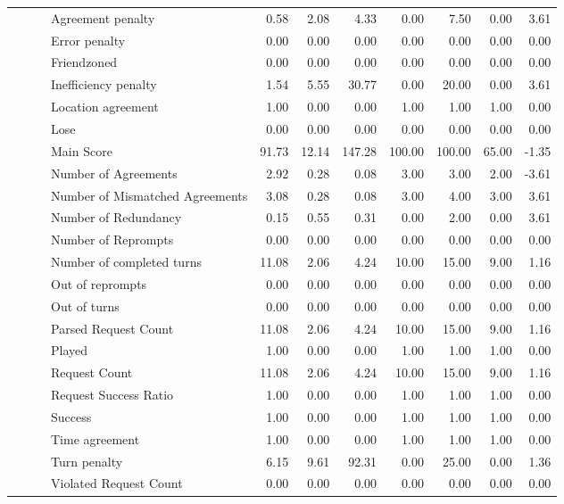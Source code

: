 \begin{tabular}{llllrrrrrrr}
 &  &  & Agreement penalty & 0.58 & 2.08 & 4.33 & 0.00 & 7.50 & 0.00 & 3.61 \\
 &  &  & Error penalty & 0.00 & 0.00 & 0.00 & 0.00 & 0.00 & 0.00 & 0.00 \\
 &  &  & Friendzoned & 0.00 & 0.00 & 0.00 & 0.00 & 0.00 & 0.00 & 0.00 \\
 &  &  & Inefficiency penalty & 1.54 & 5.55 & 30.77 & 0.00 & 20.00 & 0.00 & 3.61 \\
 &  &  & Location agreement & 1.00 & 0.00 & 0.00 & 1.00 & 1.00 & 1.00 & 0.00 \\
 &  &  & Lose & 0.00 & 0.00 & 0.00 & 0.00 & 0.00 & 0.00 & 0.00 \\
 &  &  & Main Score & 91.73 & 12.14 & 147.28 & 100.00 & 100.00 & 65.00 & -1.35 \\
 &  &  & Number of Agreements & 2.92 & 0.28 & 0.08 & 3.00 & 3.00 & 2.00 & -3.61 \\
 &  &  & Number of Mismatched Agreements & 3.08 & 0.28 & 0.08 & 3.00 & 4.00 & 3.00 & 3.61 \\
 &  &  & Number of Redundancy & 0.15 & 0.55 & 0.31 & 0.00 & 2.00 & 0.00 & 3.61 \\
 &  &  & Number of Reprompts & 0.00 & 0.00 & 0.00 & 0.00 & 0.00 & 0.00 & 0.00 \\
 &  &  & Number of completed turns & 11.08 & 2.06 & 4.24 & 10.00 & 15.00 & 9.00 & 1.16 \\
 &  &  & Out of reprompts & 0.00 & 0.00 & 0.00 & 0.00 & 0.00 & 0.00 & 0.00 \\
 &  &  & Out of turns & 0.00 & 0.00 & 0.00 & 0.00 & 0.00 & 0.00 & 0.00 \\
 &  &  & Parsed Request Count & 11.08 & 2.06 & 4.24 & 10.00 & 15.00 & 9.00 & 1.16 \\
 &  &  & Played & 1.00 & 0.00 & 0.00 & 1.00 & 1.00 & 1.00 & 0.00 \\
 &  &  & Request Count & 11.08 & 2.06 & 4.24 & 10.00 & 15.00 & 9.00 & 1.16 \\
 &  &  & Request Success Ratio & 1.00 & 0.00 & 0.00 & 1.00 & 1.00 & 1.00 & 0.00 \\
 &  &  & Success & 1.00 & 0.00 & 0.00 & 1.00 & 1.00 & 1.00 & 0.00 \\
 &  &  & Time agreement & 1.00 & 0.00 & 0.00 & 1.00 & 1.00 & 1.00 & 0.00 \\
 &  &  & Turn penalty & 6.15 & 9.61 & 92.31 & 0.00 & 25.00 & 0.00 & 1.36 \\
 &  &  & Violated Request Count & 0.00 & 0.00 & 0.00 & 0.00 & 0.00 & 0.00 & 0.00 \\

\end{tabular}

